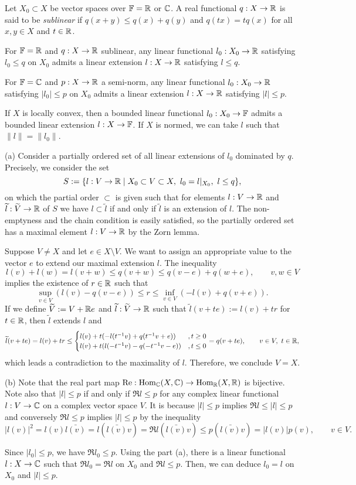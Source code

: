 \documentclass{../../large}
\begin{document}
\begin{prb}
Let $X_0\subset X$ be vector spaces over $\mathbb{F}=\mathbb{R}$ or $\mathbb{C}$.
A real functional $q:X\to\mathbb{R}$ is said to be \emph{sublinear} if $q(x+y)\le q(x)+q(y)$ and $q(tx)=tq(x)$ for all $x,y\in X$ and $t\in\mathbb{R}$.
\begin{parts}
\item For $\mathbb{F}=\mathbb{R}$ and $q:X\to\mathbb{R}$ sublinear, any linear functional $l_0:X_0\to\mathbb{R}$ satisfying $l_0\le q$ on $X_0$ admits a linear extension $l:X\to\mathbb{R}$ satisfying $l\le q$.
\item For $\mathbb{F}=\mathbb{C}$ and $p:X\to\mathbb{R}$ a semi-norm, any linear functional $l_0:X_0\to\mathbb{R}$ satisfying $|l_0|\le p$ on $X_0$ admits a linear extension $l:X\to\mathbb{R}$ satisfying $|l|\le p$.
\item If $X$ is locally convex, then a bounded linear functional $l_0:X_0\to\mathbb{F}$ admits a bounded linear extension $l:X\to\mathbb{F}$.
If $X$ is normed, we can take $l$ such that $\|l\|=\|l_0\|$.
\end{parts}
\end{prb}
\begin{pf}
(a)
Consider a partially ordered set of all linear extensions of $l_0$ dominated by $q$.
Precisely, we consider the set
\[S:=\{l:V\to\mathbb{R}\mid
X_0\subset V\subset X,\ l_0=l|_{X_0},\ l\le q\},\]
on which the partial order $\subset$ is given such that for elements $l:V\to\mathbb{R}$ and $\widetilde l:\widetilde V\to\mathbb{R}$ of $S$ we have $l\subset\tilde l$ if and only if $\tilde l$ is an extension of $l$.
The non-emptyness and the chain condition is easily satisfied, so the partially ordered set has a maximal element $l:V\to\mathbb{R}$ by the Zorn lemma.

Suppose $V\ne X$ and let $e\in X\setminus V$.
We want to assign an appropriate value to the vector $e$ to extend our maximal extension $l$.
The inequality
\[l(v)+l(w)=l(v+w)\le q(v+w)\le q(v-e)+q(w+e),\qquad v,w\in V\]
implies the existence of $r\in\mathbb{R}$ such that
\[\sup_{v\in V}(l(v)-q(v-e))\le r\le\inf_{v\in V}(-l(v)+q(v+e)).\]
If we define $\widetilde V:=V+\mathbb{R} e$ and $\widetilde l:\widetilde V\to\mathbb{R}$ such that $\tilde l(v+te):=l(v)+tr$ for $t\in\mathbb{R}$, then $\tilde l$ extends $l$ and
\[\widetilde l(v+te)=l(v)+tr\le
\begin{cases}l(v)+t(-l(t^{-1}v)+q(t^{-1}v+e))&,t\ge0\\l(v)+t(l(-t^{-1}v)-q(-t^{-1}v-e))&,t\le0
\end{cases}
=q(v+te),\qquad v\in V,\ t\in\mathbb{R},
\]
which leads a contradiction to the maximality of $l$.
Therefore, we conclude $V=X$.

(b)
Note that the real part map $\operatorname{Re}:\operatorname{Hom}_{\mathbb{C}}(X,\mathbb{C})\to\operatorname{Hom}_{\mathbb{R}}(X,\mathbb{R})$ is bijective.
Note also that $|l|\le p$ if and only if $\Re l\le p$ for any complex linear functional $l:V\to\mathbb{C}$ on a complex vector space $V$.
It is because $|l|\le p$ implies $\Re l\le|l|\le p$ and conversely $\Re l\le p$ implies $|l|\le p$ by the inequality
\[|l(v)|^2=l(v)\bar{l(v)}=l(\bar{l(v)}v)=\Re l(\bar{l(v)}v)\le p(\bar{l(v)}v)=|l(v)|p(v),\qquad v\in V.\]

Since $|l_0|\le p$, we have $\Re l_0\le p$.
Using the part (a), there is a linear functional $l:X\to\mathbb{C}$ such that $\Re l_0=\Re l$ on $X_0$ and $\Re l\le p$.
Then, we can deduce $l_0=l$ on $X_0$ and $|l|\le p$.
\end{pf}
\end{document}
